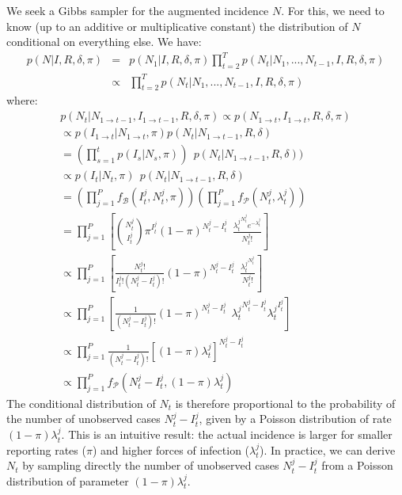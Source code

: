 \documentclass[a4paper,11pt]{article}
\begin{document}
We seek a Gibbs sampler for the augmented incidence $N$.
For this, we need to know (up to an additive or multiplicative constant) the 
distribution of $N$ conditional on everything else.
We have:
\begin{eqnarray}
 p(N|I, R, \delta, \pi) & = & p(N_1 | I, R,
\delta, \pi) \prod_{t=2}^T p(N_t | N_1, ..., N_{t-1}, I, 
R, \delta, \pi) \\
&\propto & \prod_{t=2}^T p(N_t | N_1, ..., N_{t-1}, I, R,
\delta, \pi)
\end{eqnarray}
where:
\begin{eqnarray}
p(N_t | N_{1 \rightarrow t-1}, I_{1 \rightarrow t-1}, R, \delta, \pi) 
\propto p(N_{1 \rightarrow t}, I_{1 \rightarrow t}, R, \delta, \pi) \\
\propto p( I_{1 \rightarrow t} | N_{1 \rightarrow t}, \pi) 
p(N_t | N_{1 \rightarrow t-1},  R, \delta) \\
= (\prod_{s=1}^t p(I_s| N_s, \pi)) \:\:
p(N_t | N_{1 \rightarrow t-1}, R, \delta))  \\
\propto p(I_t | N_t, \pi) \:\:
p(N_t | N_{1 \rightarrow t-1},  R, \delta)\\
= (\prod_{j=1}^P f_{\mathcal{B}}(I_t^j, N_t^j, \pi))
(\prod_{j=1}^P  f_{\mathcal{P}}(N_t^j, \lambda_t^j))\\
= \prod_{j=1}^P [ {N_t^j \choose I_t^j} \pi^{I_t^j} 
(1-\pi)^{N_t^j - I_t^j} \:\: 
\frac{{\lambda_t^j}^{N_t^j} e^{-\lambda_t^j}}{N_t^j!}]\\
\propto \prod_{j=1}^P [ \frac{N_t^j!}{I_t^j!(N_t^j-I_t^j)!} 
(1-\pi)^{N_t^j - I_t^j} \:\: 
\frac{{\lambda_t^j}^{N_t^j}}{N_t^j!}]\\
\propto \prod_{j=1}^P [ \frac{1}{(N_t^j-I_t^j)!} 
(1-\pi)^{N_t^j - I_t^j} \:\: 
{\lambda_t^j}^{N_t^j - I_t^j}{\lambda_t^j}^{I_t^j}]\\
\propto \prod_{j=1}^P \frac{1}{(N_t^j-I_t^j)!} 
[(1-\pi)\lambda_t^j]^{N_t^j - I_t^j}\\
\propto \prod_{j=1}^P f_{\mathcal{P}}(N_t^j-I_t^j , (1-\pi)\lambda_t^j)
\end{eqnarray}
The conditional distribution of $N_t$ is therefore proportional to the 
probability of the number of unobserved cases $N_t^j-I_t^j$, given by a Poisson 
distribution of rate $(1-\pi)\lambda_t^j$. This is an intuitive result: the 
actual incidence is larger for smaller reporting rates ($\pi$) and higher 
forces of infection ($\lambda_t^j$).
In practice, we can derive $N_t$ by sampling directly the number of unobserved 
cases $N_t^j-I_t^j$ from a Poisson distribution of parameter 
$(1-\pi)\lambda_t^j$.
\end{document}
